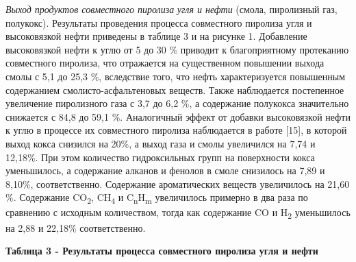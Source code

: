 \emph{Выход продуктов совместного пиролиза} \emph{угля и нефти} (смола,
пиролизный газ, полукокс). Результаты проведения процесса совместного
пиролиза угля и высоковязкой нефти приведены в таблице 3 и на рисунке 1.
Добавление высоковязкой нефти к углю от 5 до 30 \% приводит к
благоприятному протеканию совместного пиролиза, что отражается на
существенном повышении выхода смолы с 5,1 до 25,3 \%, вследствие того,
что нефть характеризуется повышенным содержанием смолисто-асфальтеновых
веществ. Также наблюдается постепенное увеличение пиролизного газа с 3,7
до 6,2 \%, а содержание полукокса значительно снижается с 84,8 до 59,1
\%. Аналогичный эффект от добавки высоковязкой нефти к углю в процессе
их совместного пиролиза наблюдается в работе {[}15{]}, в которой выход
кокса снизился на 20\%, а выход газа и смолы увеличился на 7,74 и
12,18\%. При этом количество гидроксильных групп на поверхности кокса
уменьшилось, а содержание алканов и фенолов в смоле снизилось на 7,89 и
8,10\%, соответственно. Содержание ароматических веществ увеличилось на
21,60 \%. Содержание CO\textsubscript{2}, CH\textsubscript{4} и
C\textsubscript{n}H\textsubscript{m} увеличилось примерно в два раза по
сравнению с исходным количеством, тогда как содержание CO и
H\textsubscript{2} уменьшилось на 2,88 и 22,18\% соответственно.

{\bfseries Таблица 3 - Результаты процесса совместного пиролиза угля и
нефти}

